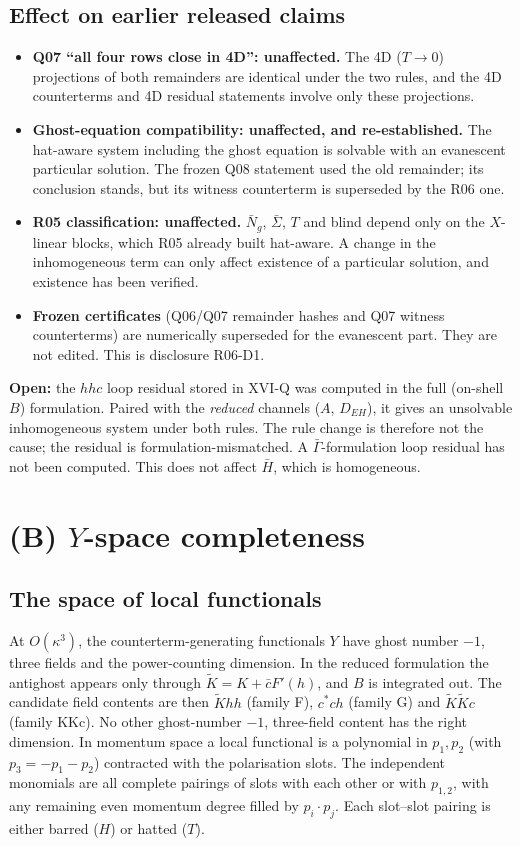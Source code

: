 \documentclass[11pt]{article}
\begin{document}
\subsection{Effect on earlier released claims}
\begin{itemize}
\item \textbf{Q07 ``all four rows close in 4D'': unaffected.} The 4D ($T\to0$) projections of both remainders are
identical under the two rules, and the 4D counterterms and 4D residual statements involve only these projections.
\item \textbf{Ghost-equation compatibility: unaffected, and re-established.} The hat-aware system including the ghost
equation is solvable with an evanescent particular solution. The frozen Q08 statement used the old remainder; its
conclusion stands, but its witness counterterm is superseded by the R06 one.
\item \textbf{R05 classification: unaffected.} $\bar N_g$, $\bar\Sigma$, $T$ and blind depend only on the $X$-linear
blocks, which R05 already built hat-aware. A change in the inhomogeneous term can only affect existence of a particular
solution, and existence has been verified.
\item \textbf{Frozen certificates} (Q06/Q07 remainder hashes and Q07 witness counterterms) are numerically superseded
for the evanescent part. They are not edited. This is disclosure R06-D1.
\end{itemize}
\textbf{Open:} the $hhc$ loop residual stored in XVI-Q was computed in the full (on-shell $B$) formulation. Paired with
the \emph{reduced} channels ($A$, $D_{EH}$), it gives an unsolvable inhomogeneous system under both rules. The rule change
is therefore not the cause; the residual is formulation-mismatched. A $\bar\Gamma$-formulation loop residual has not
been computed. This does not affect $\bar H$, which is homogeneous.

\section{(B) $Y$-space completeness}
\subsection{The space of local functionals}
At $O(\kappa^3)$, the counterterm-generating functionals $Y$ have ghost number $-1$, three fields and the power-counting
dimension. In the reduced formulation the antighost appears only through $\tilde K=K+\bar c F'(h)$, and $B$ is integrated
out. The candidate field contents are then $\tilde K hh$ (family F), $c^*ch$ (family G) and $\tilde K\tilde Kc$ (family
KKc). No other ghost-number $-1$, three-field content has the right dimension. In momentum space a local functional is a
polynomial in $p_1,p_2$ (with $p_3=-p_1-p_2$) contracted with the polarisation slots. The independent monomials are all
complete pairings of slots with each other or with $p_{1,2}$, with any remaining even momentum degree filled by
$p_i\!\cdot p_j$. Each slot--slot pairing is either barred ($H$) or hatted ($T$).
\end{document}
